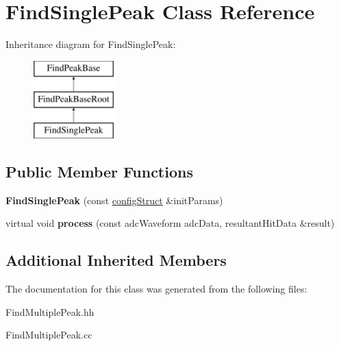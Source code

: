 \hypertarget{class_find_single_peak}{}\section{Find\+Single\+Peak Class Reference}
\label{class_find_single_peak}
Inheritance diagram for Find\+Single\+Peak\+:\begin{figure}[H]
\begin{center}
\leavevmode
\includegraphics[height=3.000000cm]{class_find_single_peak}
\end{center}
\end{figure}
\subsection*{Public Member Functions}
\begin{DoxyCompactItemize}
\item 
\hypertarget{class_find_single_peak_a5453373fe5dcd2b562a6196c1f672962}{}{\bfseries Find\+Single\+Peak} (const \hyperlink{structconfig_struct}{config\+Struct} \&init\+Params)\label{class_find_single_peak_a5453373fe5dcd2b562a6196c1f672962}

\item 
\hypertarget{class_find_single_peak_a1c51746e44a2c72981b45891128c3847}{}virtual void {\bfseries process} (const adc\+Waveform adc\+Data, resultant\+Hit\+Data \&result)\label{class_find_single_peak_a1c51746e44a2c72981b45891128c3847}

\end{DoxyCompactItemize}
\subsection*{Additional Inherited Members}


The documentation for this class was generated from the following files\+:\begin{DoxyCompactItemize}
\item 
Find\+Multiple\+Peak.\+hh\item 
Find\+Multiple\+Peak.\+cc\end{DoxyCompactItemize}
